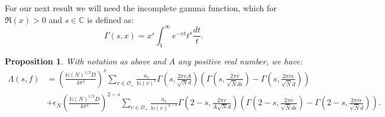 \documentclass{article}
\theoremstyle{plain}
\newtheorem{proposition}{Proposition}
\begin{document}
For our next result we will need the incomplete gamma function, which for $\mathfrak{R}(x)>0$ and $s \in \mathbb{C}$ is defined as:
\begin{equation*}
\Gamma(s, x)=x^s\int_1^{\infty}e^{-xt}t^s \frac{dt}{t}.
\end{equation*}

\begin{proposition}\label{Lambda}
With notation as above and $A$ any positive real number, we have:
\begin{equation*}
\begin{split}
\Lambda(s,f) &= \left(\frac{\mathbb{N}(N)^{1/2}D}{4\pi^2}\right)^s \sum_{v \in \mathcal{O}_+} \frac{a_v}{\mathbb{N}(v)^s} \Gamma\left(s, \frac{2\pi v A}{\sqrt{N}d}\right) \left(\Gamma\left(s,\frac{2 \pi \bar{v}}{\sqrt{\bar{N}}\bar{d} \epsilon} \right)-  \Gamma\left(s,\frac{2 \pi \bar{v}\epsilon}{\sqrt{\bar{N}}\bar{d} } \right) \right) \\
&+ \epsilon_N  \left(\frac{\mathbb{N}(N)^{1/2}D}{4\pi^2}\right)^{2-s}\sum_{v \in \mathcal{O}_+} \frac{a_v}{\mathbb{N}(v)^{2-s}} \Gamma\left(2-s, \frac{2\pi v }{A\sqrt{N}d}\right) \left(\Gamma\left(2-s,\frac{2 \pi \bar{v}}{\sqrt{\bar{N}}\bar{d} \epsilon} \right)-  \Gamma\left(2-s,\frac{2 \pi \bar{v}\epsilon}{\sqrt{\bar{N}}\bar{d} } \right) \right) .
\end{split}
\end{equation*}
\end{proposition}
\end{document}
